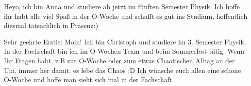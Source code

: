 \begin{multicols}{2}
{
Heyo, ich bin Anna und studiere ab jetzt im fünften Semester Physik. 
Ich hoffe ihr habt alle viel Spaß in der O-Woche und schafft es gut ins Studium, hoffentlich diesmal tatsächlich in Präsenz:)
}


{
Sehr geehrte Erstis: Moin!
Ich bin Christoph und studiere im 3. Semester Physik. In der Fachschaft bin ich im O-Wochen Team und beim Sommerfest tätig. Wenn Ihr Fragen habt, z.B zur O-Woche oder zum etwas Chaotischen Alltag an der Uni, immer her damit, es lebe das Chaos :D 
Ich wünsche euch allen eine schöne O-Woche und hoffe man sieht sich mal in der Fachschaft.
}



\end{multicols}
